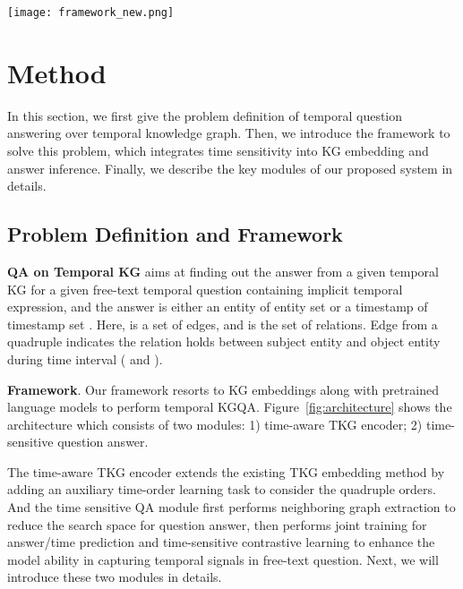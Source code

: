\documentclass[11pt]{article}
\newcommand{\xhdr}[1]{{\noindent\bfseries #1}.}
\newcommand{\xhdrnd}[1]{{\noindent\bfseries #1}}
\begin{document}
\begin{figure*}[ht]
  \centering
  \texttt{[image: framework\_new.png]}
  \caption{The architecture of our TSQA model (\textbf{Left}: Time-aware TKG encoder; \textbf{Right}: Time-Sensitive TKG-QA). 
  }
  \label{fig:architecture}
\end{figure*}



\section{Method}




In this section, we first give the problem definition of temporal question answering over temporal knowledge graph. Then, we introduce the framework to solve this problem, which integrates time sensitivity into KG embedding and answer inference. Finally, we describe the key modules of our proposed system in details.  




\subsection{Problem Definition and Framework}

\xhdrnd{QA on Temporal KG} aims at finding out the answer from a given temporal KG  for a given free-text temporal question  containing implicit temporal expression, and the answer is either an entity of entity set  or a timestamp of timestamp set . Here,  is a set of edges, and  is the set of relations. 
Edge from a quadruple  indicates the relation  holds between subject entity  and object entity  during time interval  ( and ).















\xhdr{Framework} Our framework resorts to KG embeddings along with pretrained language models to perform temporal KGQA.  Figure~\ref{fig:architecture} shows the architecture which consists of two modules: 1) time-aware TKG encoder; 2) time-sensitive question answer. 

The time-aware TKG encoder extends the existing TKG embedding method by adding an auxiliary time-order learning task to consider the quadruple orders. And the time sensitive QA module first performs neighboring graph extraction to reduce the search space for question answer, then performs joint training for answer/time prediction and time-sensitive contrastive learning to enhance the model ability in capturing temporal signals in free-text question. Next, we will introduce these two modules in details.
\end{document}
